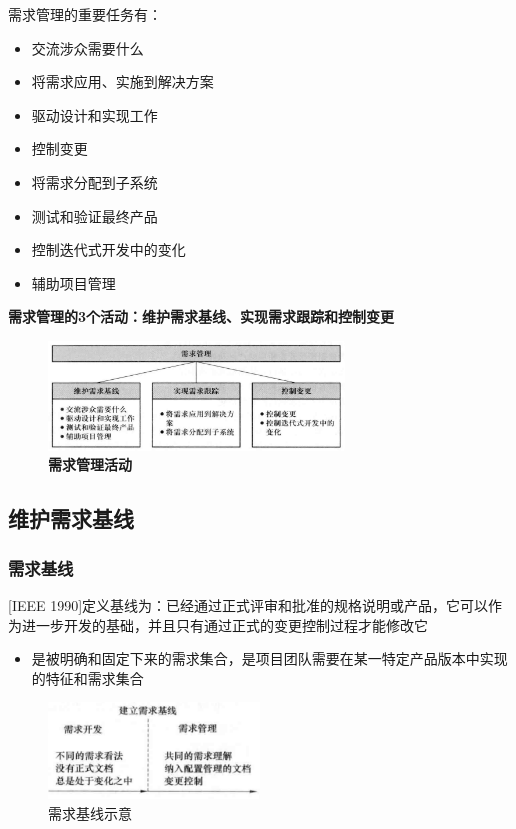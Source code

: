 需求管理的重要任务有：
\vspace{-0.8em}
\begin{multicols}{2}
    \begin{itemize}
        \item 交流涉众需要什么
        \item 将需求应用、实施到解决方案
        \item 驱动设计和实现工作
        \item 控制变更
        \item 将需求分配到子系统
        \item 测试和验证最终产品
        \item 控制迭代式开发中的变化
        \item 辅助项目管理
    \end{itemize}
\end{multicols}
\vspace{-1em}

\textbf{需求管理的3个活动：维护需求基线、实现需求跟踪和控制变更}
\begin{figure}[H]
	\centering
	\includegraphics[width=0.7\textwidth]{img/需求管理活动.png}
    \caption*{\textbf{需求管理活动}}
    \vspace{-1em}
\end{figure}


\subsection{维护需求基线}

\subsubsection{需求基线}
[IEEE 1990]定义基线为：已经通过正式评审和批准的规格说明或产品，它可以作为进一步开发的基础，并且只有通过正式的变更控制过程才能修改它
\begin{itemize}
    \item 是被明确和固定下来的需求集合，是项目团队需要在某一特定产品版本中实现的特征和需求集合
\end{itemize}

\begin{figure}[H]
	\centering
    \vspace{-0.5em}
	\includegraphics[width=0.5\textwidth]{img/需求基线示意.png}
    \caption*{需求基线示意}
    \vspace{-1em}
\end{figure}


